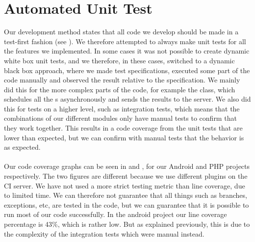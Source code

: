
\section{Automated Unit Test}
\label{sec:automated_unit_test}

Our development method states that all code we develop should be made in a test-first fashion (see ). We therefore attempted to always make unit tests for all the features we implemented. In some cases it was not possible to create dynamic white box unit tests, and we therefore, in these cases, switched to a dynamic black box approach, where we made test specifications, executed some part of the code manually and observed the result relative to the specification. We mainly did this for the more complex parts of the code, for example the  class, which schedules all the s asynchronously and sends the results to the server. We also did this for tests on a higher level, such as integration tests, which means that the combinations of our different modules only have manual tests to confirm that they work together. This results in a code coverage from the unit tests that are lower than expected, but we can confirm with manual tests that the behavior is as expected. 
\\\\
Our code coverage graphs can be seen in  and , for our Android and PHP projects respectively. The two figures are different because we use different plugins on the CI server. We have not used a more strict testing metric than line coverage, due to limited time. We can therefore not guarantee that all things such as branches, exceptions, etc, are tested in the code, but we can guarantee that it is possible to run most of our code successfully. In the android project our line coverage percentage is 43\%, which is rather low. But as explained previously, this is due to the complexity of the integration tests which were manual instead. 


